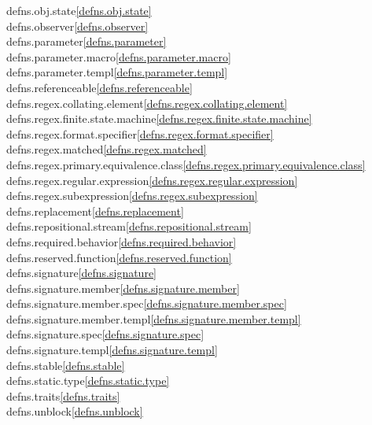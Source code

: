 \begin{multicols}{2}
defns.obj.state\quad\ref{defns.obj.state}\\
defns.observer\quad\ref{defns.observer}\\
defns.parameter\quad\ref{defns.parameter}\\
defns.parameter.macro\quad\ref{defns.parameter.macro}\\
defns.parameter.templ\quad\ref{defns.parameter.templ}\\
defns.referenceable\quad\ref{defns.referenceable}\\
defns.regex.collating.element\quad\ref{defns.regex.collating.element}\\
defns.regex.finite.state.machine\quad\ref{defns.regex.finite.state.machine}\\
defns.regex.format.specifier\quad\ref{defns.regex.format.specifier}\\
defns.regex.matched\quad\ref{defns.regex.matched}\\
defns.regex.primary.equivalence.class\quad\ref{defns.regex.primary.equivalence.class}\\
defns.regex.regular.expression\quad\ref{defns.regex.regular.expression}\\
defns.regex.subexpression\quad\ref{defns.regex.subexpression}\\
defns.replacement\quad\ref{defns.replacement}\\
defns.repositional.stream\quad\ref{defns.repositional.stream}\\
defns.required.behavior\quad\ref{defns.required.behavior}\\
defns.reserved.function\quad\ref{defns.reserved.function}\\
defns.signature\quad\ref{defns.signature}\\
defns.signature.member\quad\ref{defns.signature.member}\\
defns.signature.member.spec\quad\ref{defns.signature.member.spec}\\
defns.signature.member.templ\quad\ref{defns.signature.member.templ}\\
defns.signature.spec\quad\ref{defns.signature.spec}\\
defns.signature.templ\quad\ref{defns.signature.templ}\\
defns.stable\quad\ref{defns.stable}\\
defns.static.type\quad\ref{defns.static.type}\\
defns.traits\quad\ref{defns.traits}\\
defns.unblock\quad\ref{defns.unblock}\\

\end{multicols}
